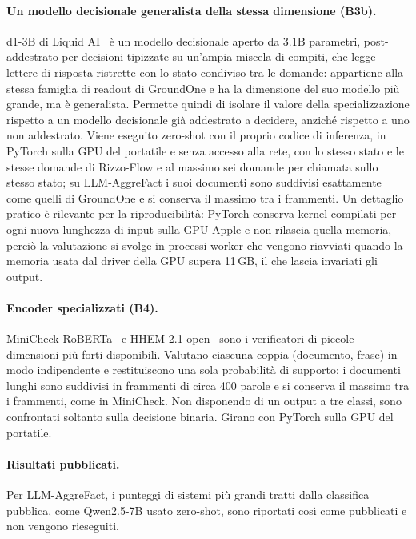 \paragraph{Un modello decisionale generalista della stessa dimensione (B3b).} d1-3B di Liquid AI~\cite{liquid2026d1} è
un modello decisionale aperto da 3.1B parametri, post-addestrato per decisioni tipizzate su un'ampia miscela di compiti,
che legge lettere di risposta ristrette con lo stato condiviso tra le domande: appartiene alla stessa famiglia di readout
di GroundOne e ha la dimensione del suo modello più grande, ma è generalista. Permette quindi di isolare il valore della
specializzazione rispetto a un modello decisionale già addestrato a decidere, anziché rispetto a uno non addestrato.
Viene eseguito zero-shot con il proprio codice di inferenza, in PyTorch sulla GPU del portatile e senza accesso alla rete,
con lo stesso stato e le stesse domande di Rizzo-Flow e al massimo sei domande per chiamata sullo stesso stato; su
LLM-AggreFact i suoi documenti sono suddivisi esattamente come quelli di GroundOne e si conserva il massimo tra i
frammenti. Un dettaglio pratico è rilevante per la riproducibilità: PyTorch conserva kernel compilati per ogni nuova
lunghezza di input sulla GPU Apple e non rilascia quella memoria, perciò la valutazione si svolge in processi worker che
vengono riavviati quando la memoria usata dal driver della GPU supera 11\,GB, il che lascia invariati gli output.

\paragraph{Encoder specializzati (B4).} MiniCheck-RoBERTa~\cite{tang2024minicheck} e HHEM-2.1-open~\cite{vectara2024hhem}
sono i verificatori di piccole dimensioni più forti disponibili. Valutano ciascuna coppia (documento, frase) in modo
indipendente e restituiscono una sola probabilità di supporto; i documenti lunghi sono suddivisi in frammenti di circa 400
parole e si conserva il massimo tra i frammenti, come in MiniCheck. Non disponendo di un output a tre classi, sono
confrontati soltanto sulla decisione binaria. Girano con PyTorch sulla GPU del portatile.

\paragraph{Risultati pubblicati.} Per LLM-AggreFact, i punteggi di sistemi più grandi tratti dalla classifica pubblica,
come Qwen2.5-7B usato zero-shot, sono riportati così come pubblicati e non vengono rieseguiti.

